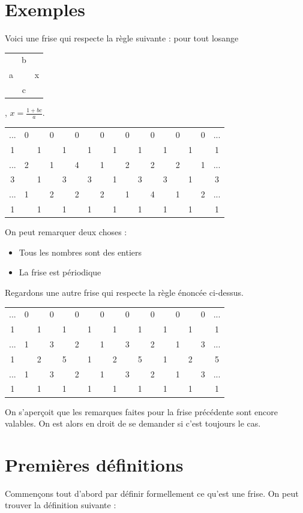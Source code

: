 \documentclass[a4paper]{article}
\theoremstyle{plain}
\theoremstyle{definition}
\theoremstyle{proof}
\theoremstyle{remark}
\begin{document}
\section{Exemples}
Voici une frise qui respecte la règle suivante :
pour tout losange \begin{tabular}{ccc}
&b&\\a&&x\\&c& 
\end{tabular}
, $x=\frac{1+bc}{a}$.
\begin{center}
\begin{tabular}{ccccccccccccccccc}
...&0&&0&&0&&0&&0&&0&&0&&0&...\\
1&&1&&1&&1&&1&&1&&1&&1&&1\\
...&2&&1&&4&&1&&2&&2&&2&&1&...\\
3&&1&&3&&3&&1&&3&&3&&1&&3\\
...&1&&2&&2&&2&&1&&4&&1&&2&...\\
1&&1&&1&&1&&1&&1&&1&&1&&1\\
\end{tabular}
\end{center}
On peut remarquer deux choses :
\begin{itemize}
\item Tous les nombres sont des entiers
\item La frise est périodique
\end{itemize}
Regardons une autre frise qui respecte la règle énoncée ci-dessus.
\begin{center}
\begin{tabular}{ccccccccccccccccc}
...&0&&0&&0&&0&&0&&0&&0&&0&...\\
1&&1&&1&&1&&1&&1&&1&&1&&1\\
...&1&&3&&2&&1&&3&&2&&1&&3&...\\
1&&2&&5&&1&&2&&5&&1&&2&&5\\
...&1&&3&&2&&1&&3&&2&&1&&3&...\\
1&&1&&1&&1&&1&&1&&1&&1&&1\\
\end{tabular}
\end{center}
On s'aperçoit que les remarques faites pour la frise précédente sont encore valables. On est alors en droit de se demander si c'est toujours le cas.
\section{Premières définitions}
Commençons tout d'abord par définir formellement ce qu'est une frise.
On peut trouver la définition suivante :
\end{document}
